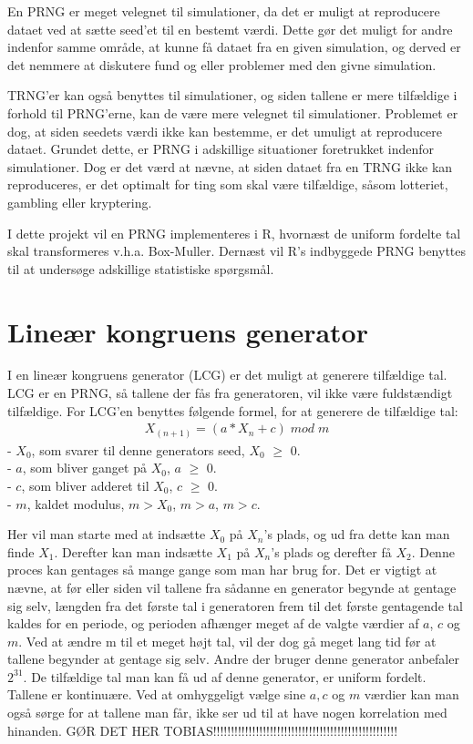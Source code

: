\documentclass[
]{article}
\begin{document}
En PRNG er meget velegnet til simulationer, da det er muligt at
reproducere dataet ved at sætte seed'et til en bestemt værdi. Dette gør
det muligt for andre indenfor samme område, at kunne få dataet fra en
given simulation, og derved er det nemmere at diskutere fund og eller
problemer med den givne simulation.

TRNG'er kan også benyttes til simulationer, og siden tallene er mere
tilfældige i forhold til PRNG'erne, kan de være mere velegnet til
simulationer. Problemet er dog, at siden seedets værdi ikke kan
bestemme, er det umuligt at reproducere dataet. Grundet dette, er PRNG i
adskillige situationer foretrukket indenfor simulationer. Dog er det
værd at nævne, at siden dataet fra en TRNG ikke kan reproduceres, er det
optimalt for ting som skal være tilfældige, såsom lotteriet, gambling
eller kryptering.

I dette projekt vil en PRNG implementeres i R, hvornæst de uniform
fordelte tal skal transformeres v.h.a. Box-Muller. Dernæst vil R's
indbyggede PRNG benyttes til at undersøge adskillige statistiske
spørgsmål.

\hypertarget{lineuxe6r-kongruens-generator}{%
\section{Lineær kongruens
generator}\label{lineuxe6r-kongruens-generator}}

I en lineær kongruens generator (LCG) er det muligt at generere
tilfældige tal. LCG er en PRNG, så tallene der fås fra generatoren, vil
ikke være fuldstændigt tilfældige. For LCG'en benyttes følgende formel,
for at generere de tilfældige tal: \[
\begin{aligned}
      X_{(n+1)}=(a*X_n+c)\;mod\;m
\end{aligned}      
\] - \(X_0\), som svarer til denne generators seed, \(X_0\) \(\geq\)
0.\\
- \(a\), som bliver ganget på \(X_0\), \(a\) \(\geq\) 0.\\
- \(c\), som bliver adderet til \(X_0\), \(c\) \(\geq\) 0.\\
- \(m\), kaldet modulus, \(m > X_0\), \(m > a\), \(m > c\).

Her vil man starte med at indsætte \(X_0\) på \(X_{n}\)'s plads, og ud
fra dette kan man finde \(X_1\). Derefter kan man indsætte \(X_1\) på
\(X_n\)'s plads og derefter få \(X_2\). Denne proces kan gentages så
mange gange som man har brug for. Det er vigtigt at nævne, at før eller
siden vil tallene fra sådanne en generator begynde at gentage sig selv,
længden fra det første tal i generatoren frem til det første gentagende
tal kaldes for en periode, og perioden afhænger meget af de valgte
værdier af \(a\), \(c\) og \(m\). Ved at ændre m til et meget højt tal,
vil der dog gå meget lang tid før at tallene begynder at gentage sig
selv. Andre der bruger denne generator anbefaler \(2^{31}\). De
tilfældige tal man kan få ud af denne generator, er uniform fordelt.
Tallene er kontinuære. Ved at omhyggeligt vælge sine \(a, c\) og \(m\)
værdier kan man også sørge for at tallene man får, ikke ser ud til at
have nogen korrelation med hinanden. GØR DET HER
TOBIAS!!!!!!!!!!!!!!!!!!!!!!!!!!!!!!!!!!!!!!!!!!!!!!!!!!!!
\end{document}
